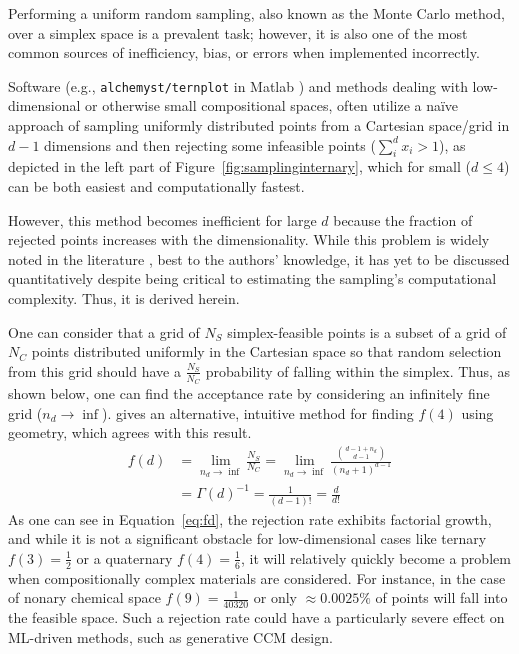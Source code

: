 Performing a uniform random sampling, also known as the Monte Carlo method, over a simplex space is a prevalent task; however, it is also one of the most common sources of inefficiency, bias, or errors when implemented incorrectly.

Software (e.g., \texttt{alchemyst/ternplot} in Matlab \cite{Sandrock2017Alchemyst/ternplothttps://github.com/alchemyst/ternplot}) and methods dealing with low-dimensional or otherwise small compositional spaces, often utilize a na\"ive approach of sampling uniformly distributed points from a Cartesian space/grid in $d-1$ dimensions and then rejecting some infeasible points ($\sum^d_i x_i > 1$), as depicted in the left part of Figure~\ref{fig:samplinginternary}, which for small ($d \leq 4$) can be both easiest and computationally fastest. 

However, this method becomes inefficient for large $d$ because the fraction of rejected points increases with the dimensionality. While this problem is widely noted in the literature \cite{Allen2022AAlloys}, best to the authors' knowledge, it has yet to be discussed quantitatively despite being critical to estimating the sampling's computational complexity. Thus, it is derived herein.

One can consider that a grid of $N_S$ simplex-feasible points is a subset of a grid of $N_C$ points distributed uniformly in the Cartesian space so that random selection from this grid should have a $\frac{N_S}{N_C}$ probability of falling within the simplex. Thus, as shown below, one can find the acceptance rate by considering an infinitely fine grid ($n_d\rightarrow\inf$).  gives an alternative, intuitive method for finding $f(4)$ using geometry, which agrees with this result.
\begin{equation}
    \begin{aligned}
        f(d) &= \lim_{n_d\rightarrow\inf} \frac{N_S}{N_C} = \lim_{n_d\rightarrow\inf} \frac{\binom{d-1+n_d}{d-1}}{(n_d+1)^{d-1}}\\
        &= \Gamma(d)^{-1} = \frac{1}{(d-1)!} = \frac{d}{d!}
    \end{aligned}
    \label{eq:fd}
\end{equation}
As one can see in Equation~\ref{eq:fd}, the rejection rate exhibits factorial growth, and while it is not a significant obstacle for low-dimensional cases like ternary $f(3)=\frac{1}{2}$ or a quaternary $f(4) = \frac{1}{6}$, it will relatively quickly become a problem when compositionally complex materials are considered. For instance, in the case of nonary chemical space $f(9) = \frac{1}{40320}$ or only $\approx0.0025\%$ of points will fall into the feasible space. Such a rejection rate could have a particularly severe effect on ML-driven methods, such as generative CCM design.

